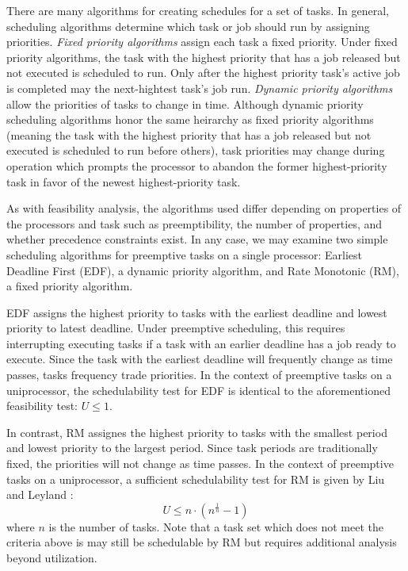 There are many algorithms for creating schedules for a set of tasks.
In general, scheduling algorithms determine which task or job should run by assigning priorities.
\textit{Fixed priority algorithms} assign each task a fixed priority.
Under fixed priority algorithms, the task with the highest priority that has a job released but not executed is scheduled to run.
Only after the highest priority task's active job is completed may the next-hightest task's job run.
\textit{Dynamic priority algorithms} allow the priorities of tasks to change in time.
Although dynamic priority scheduling algorithms honor the same heirarchy as fixed priority algorithms (meaning the task with the highest priority that has a job released but not executed is scheduled to run before others), task priorities may change during operation which prompts the processor to abandon the former highest-priority task in favor of the newest highest-priority task.

As with feasibility analysis, the algorithms used differ depending on properties of the processors and task such as preemptibility, the number of properties, and whether precedence constraints exist.
In any case, we may examine two simple scheduling algorithms for preemptive tasks on a single processor: Earliest Deadline First (EDF), a dynamic priority algorithm, and Rate Monotonic (RM), a fixed priority algorithm.

EDF assigns the highest priority to tasks with the earliest deadline and lowest priority to latest deadline.
Under preemptive scheduling, this requires interrupting executing tasks if a task with an earlier deadline has a job ready to execute.
Since the task with the earliest deadline will frequently change as time passes, tasks frequency trade priorities.
In the context of preemptive tasks on a uniprocessor, the schedulability test for EDF is identical to the aforementioned feasibility test: $U \leq 1$.

In contrast, RM assignes the highest priority to tasks with the smallest period and lowest priority to the largest period.
Since task periods are traditionally fixed, the priorities will not change as time passes.
In the context of preemptive tasks on a uniprocessor, a sufficient schedulability test for RM is given by Liu and Leyland \cite{liu_scheduling_1973}:
\begin{equation}
    U \leq n \cdot (n^{\frac{1}{n}}-1)
\end{equation}
where $n$ is the number of tasks.
Note that a task set which does not meet the criteria above is may still be schedulable by RM but requires additional analysis beyond utilization.

